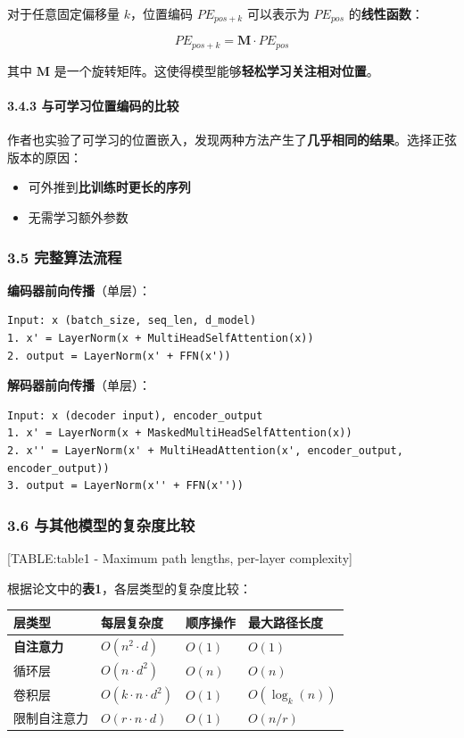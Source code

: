 \documentclass[11pt,a4paper]{article}
\begin{document}
对于任意固定偏移量 $k$，位置编码 $PE_{pos+k}$ 可以表示为 $PE_{pos}$ 的\textbf{线性函数}：

\[
PE_{pos+k} = \mathbf{M} \cdot PE_{pos}
\]

其中 $\mathbf{M}$ 是一个旋转矩阵。这使得模型能够\textbf{轻松学习关注相对位置}。

\paragraph{3.4.3 与可学习位置编码的比较}

作者也实验了可学习的位置嵌入，发现两种方法产生了\textbf{几乎相同的结果}。选择正弦版本的原因：
\begin{itemize}
  \item 可外推到\textbf{比训练时更长的序列}
  \item 无需学习额外参数
\end{itemize}

\subsubsection*{3.5 完整算法流程}

\textbf{编码器前向传播}（单层）：

\begin{verbatim}
Input: x (batch_size, seq_len, d_model)
1. x' = LayerNorm(x + MultiHeadSelfAttention(x))
2. output = LayerNorm(x' + FFN(x'))
\end{verbatim}

\textbf{解码器前向传播}（单层）：

\begin{verbatim}
Input: x (decoder input), encoder_output
1. x' = LayerNorm(x + MaskedMultiHeadSelfAttention(x))
2. x'' = LayerNorm(x' + MultiHeadAttention(x', encoder_output, encoder_output))
3. output = LayerNorm(x'' + FFN(x''))
\end{verbatim}

\subsubsection*{3.6 与其他模型的复杂度比较}

[TABLE:table1 - Maximum path lengths, per-layer complexity]

根据论文中的\textbf{表1}，各层类型的复杂度比较：

\begin{center}
\begin{tabular}{|l|l|l|l|}
\hline
层类型 & 每层复杂度 & 顺序操作 & 最大路径长度 \\
\hline
\textbf{自注意力} & $O(n^2 \cdot d)$ & $O(1)$ & $O(1)$ \\
\hline
循环层 & $O(n \cdot d^2)$ & $O(n)$ & $O(n)$ \\
\hline
卷积层 & $O(k \cdot n \cdot d^2)$ & $O(1)$ & $O(\log_k(n))$ \\
\hline
限制自注意力 & $O(r \cdot n \cdot d)$ & $O(1)$ & $O(n/r)$ \\
\hline
\end{tabular}
\end{center}
\end{document}
